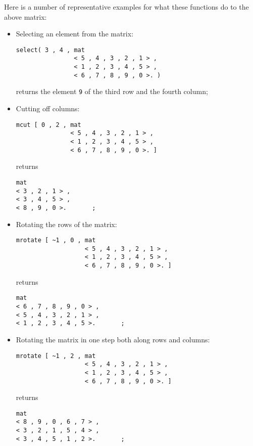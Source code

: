 Here is a number of representative examples for what these
 functions do to the above matrix:
\begin{itemize}
\item Selecting an element from the matrix:
\begin{verbatim}
select( 3 , 4 , mat 
                < 5 , 4 , 3 , 2 , 1 > ,
                < 1 , 2 , 3 , 4 , 5 > ,
                < 6 , 7 , 8 , 9 , 0 >. )
\end{verbatim}
returns the element {\tt 9} of the third row and the fourth
column;
\item Cutting off columns:
\begin{verbatim}
mcut [ 0 , 2 , mat 
               < 5 , 4 , 3 , 2 , 1 > ,
               < 1 , 2 , 3 , 4 , 5 > ,
               < 6 , 7 , 8 , 9 , 0 >. ]
\end{verbatim}
returns
\begin{verbatim}
mat 
< 3 , 2 , 1 > ,
< 3 , 4 , 5 > ,
< 8 , 9 , 0 >.       ;
\end{verbatim}
\item Rotating the rows of the matrix:
\begin{verbatim}
mrotate [ ~1 , 0 , mat 
                   < 5 , 4 , 3 , 2 , 1 > ,
                   < 1 , 2 , 3 , 4 , 5 > ,
                   < 6 , 7 , 8 , 9 , 0 >. ]
\end{verbatim}
returns
\begin{verbatim}
mat 
< 6 , 7 , 8 , 9 , 0 > ,
< 5 , 4 , 3 , 2 , 1 > ,
< 1 , 2 , 3 , 4 , 5 >.       ;
\end{verbatim}
\item Rotating the matrix in one step both
along rows and columns:
\begin{verbatim}
mrotate [ ~1 , 2 , mat 
                   < 5 , 4 , 3 , 2 , 1 > ,
                   < 1 , 2 , 3 , 4 , 5 > ,
                   < 6 , 7 , 8 , 9 , 0 >. ]
\end{verbatim}
returns
\begin{verbatim}
mat 
< 8 , 9 , 0 , 6 , 7 > ,
< 3 , 2 , 1 , 5 , 4 > ,
< 3 , 4 , 5 , 1 , 2 >.       ;
\end{verbatim}

\end{itemize}
